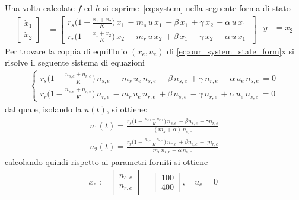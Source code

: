 \documentclass[a4paper, 11pt]{article}
\begin{document}
%
Una volta calcolate $f$ ed $h$ si esprime~\eqref{eq:system} nella seguente forma di stato
%
\begin{subequations}\label{eq:our_system_state_form}
\begin{align}
	\begin{bmatrix}
		\dot{x}_1
		\\
		\dot{x}_2
	\end{bmatrix} &= \begin{bmatrix}
	r_s \bigl(1-\frac{x_1+x_2}{K}\bigr)\, x_1\, -m_s\, u\, x_1\, -\beta\, x_1\, +\gamma\, x_2\, -\alpha\, u\, x_1\ 
	\\
	r_r \bigl(1-\frac{x_1+x_2 }{K}\bigr)\, x_2\, -m_r\, u\, x_2\, +\beta\, x_1\, -\gamma\, x_2\, +\alpha\, u\, x_1\ 
\end{bmatrix} \label{eq:state_form_1}
\end{align}
\begin{align}
	y &= x_2
\end{align}
\end{subequations}
%
Per trovare la coppia di equilibrio $(x_e, u_e)$ di \eqref{eq:our_system_state_form}x si risolve il seguente sistema di equazioni
%
\begin{align}
	\begin{cases}
		r_s \bigl(1-\frac{n_{s,e}+n_{r,e}}{K}\bigr)\, n_{s,e}\, -m_s\, u_e\, n_{s,e}\, -\beta\, n_{s,e}\, +\gamma\, n_{r,e}\, -\alpha\, u_e\, n_{s,e}\, =0
		\\
		r_r \bigl(1-\frac{n_{s,e}+n_{r,e}}{K}\bigr)\, n_{r,e}\, -m_r\, u_e\, n_{r,e}\, +\beta\, n_{s,e}\, -\gamma\, n_{r,e}\, +\alpha\, u_e\, n_{s,e}\, =0
	\end{cases}
\end{align}
%
dal quale, isolando la $u(t)$, si ottiene:
%
\begin{subequations}
\begin{align}
	u_1(t)=\frac{r_s \bigl(1-\frac{n_{s,e}+n_{r,e}}{K}\bigr)\, n_{s,e}\,-\beta n_{s,e}\,+\gamma n_{r,e}}{(m_s+\alpha)\,n_{s,e}} 
	\\
	u_2(t)=\frac{r_r \bigl(1-\frac{n_{s,e}+n_{r,e}}{K}\bigr)\, n_{r,e}\,+\beta n_{s,e}\,-\gamma n_{r,e}}{m_r\,n_{r,e}+\alpha\,n_{s,e}}
\end{align}
\end{subequations}
%
calcolando quindi rispetto ai parametri forniti si ottiene
%
\begin{align}
	x_e :=\begin{bmatrix}
		n_{s,e}
		\\
		n_{r,e}
	\end{bmatrix} = 
	\begin{bmatrix}
		100
		\\
		400
	\end{bmatrix},  \quad u_e = 0 \
	\label{eq:equilibirum_pair}
\end{align}
\end{document}
